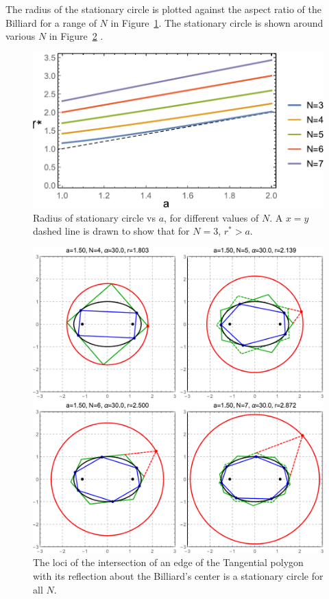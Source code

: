 \noindent The radius of the stationary circle is plotted against the aspect ratio of the Billiard for a range of $N$ in Figure~\ref{fig:stationary-radius-vs-a}. The stationary circle is shown around various $N$ in  Figure~\ref{fig:gen-circ-grid} .

\begin{figure}
    \centering
    \includegraphics[width=.75\textwidth]{pics/0190_rstar.pdf}
    \caption{Radius of stationary circle vs $a$, for different values of $N$. A $x=y$ dashed line is drawn to show that for $N=3$, $r^*>a$.}
    \label{fig:stationary-radius-vs-a}
\end{figure}

\begin{figure}[H]
    \centering
    \includegraphics[width=\textwidth]{pics/0180_circ_grid.pdf}
    \caption{The loci of the intersection of an edge of the Tangential polygon with its reflection about the Billiard's center is a stationary circle for all $N$.}
    \label{fig:gen-circ-grid}
\end{figure}

